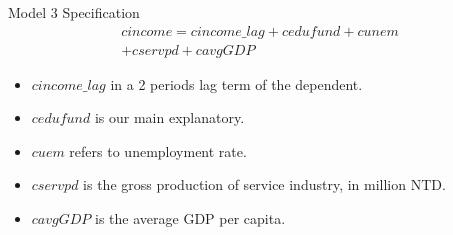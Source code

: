 \documentclass[compress]{beamer}
\begin{document}
\begin{frame}{Model 3 Specification}
  \begin{multline}
    cincome = cincome\_lag + cedufund + cunem \\
    + cservpd + cavgGDP
  \end{multline}
  \begin{itemize}
    \item $cincome\_lag$ in a 2 periods lag term of the dependent.
    \item $cedufund$ is our main explanatory.
    \item $cuem$ refers to unemployment rate.
    \item $cservpd$ is the gross production of service industry, in million NTD.
    \item $cavgGDP$ is the average GDP per capita.
  \end{itemize}
\end{frame}
\end{document}

